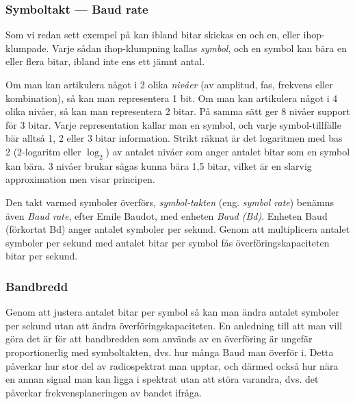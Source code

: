 \subsubsection{Symboltakt --- Baud rate}

Som vi redan sett exempel på kan ibland bitar skickas en och en, eller
ihop-klumpade. Varje sådan ihop-klumpning kallas \emph{symbol}, och en symbol
kan bära en eller flera bitar, ibland inte ens ett jämnt antal.

Om man kan artikulera något i 2 olika \emph{nivåer} (av amplitud, fas, frekvens
eller kombination), så kan man representera 1 bit. Om man kan artikulera något
i 4 olika nivåer, så kan man representera 2 bitar. På samma sätt ger 8 nivåer
support för 3 bitar. Varje representation kallar man en symbol, och varje
symbol-tillfälle bär alltså 1, 2 eller 3 bitar information. Strikt räknat
är det logaritmen med bas 2 (2-logaritm eller $\log_{2}$) av antalet nivåer som
anger antalet bitar som en symbol kan bära. 3 nivåer brukar sägas kunna bära
1,5 bitar, vilket är en slarvig approximation men visar principen.

Den takt varmed symboler överförs, \emph{symbol-takten} (eng. \emph{symbol rate})
benämns även \emph{Baud rate}, efter Emile Baudot, med enheten \emph{Baud (Bd)}.
Enheten Baud (förkortat Bd) anger antalet symboler per sekund. Genom att
multiplicera antalet symboler per sekund med antalet bitar per symbol fås
överföringskapaciteten bitar per sekund.

\subsubsection{Bandbredd}

Genom att justera antalet bitar per symbol så kan man ändra antalet symboler
per sekund utan att ändra överföringskapaciteten. En anledning till att man
vill göra det är för att bandbredden som används av en överföring är ungefär
proportionerlig med symboltakten, dvs. hur många Baud man överför i.
Detta påverkar hur stor del av radiospektrat man upptar, och därmed också hur
nära en annan signal man kan ligga i spektrat utan att störa varandra, dvs.
det påverkar frekvensplaneringen av bandet ifråga.

